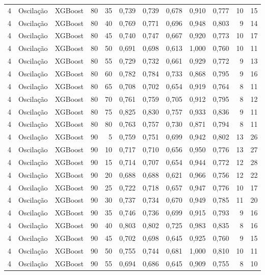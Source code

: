 \begin{longtable}{@{}rllrrrrrrrrr@{}}
4 & Oscilação & XGBoost & 80 & 35 & 0,739 & 0,739 & 0,678 & 0,910 & 0,777 & 10 & 15 \\
4 & Oscilação & XGBoost & 80 & 40 & 0,769 & 0,771 & 0,696 & 0,948 & 0,803 & 9 & 14 \\
4 & Oscilação & XGBoost & 80 & 45 & 0,740 & 0,747 & 0,667 & 0,920 & 0,773 & 10 & 17 \\
4 & Oscilação & XGBoost & 80 & 50 & 0,691 & 0,698 & 0,613 & 1,000 & 0,760 & 10 & 11 \\
4 & Oscilação & XGBoost & 80 & 55 & 0,729 & 0,732 & 0,661 & 0,929 & 0,772 & 9 & 13 \\
4 & Oscilação & XGBoost & 80 & 60 & 0,782 & 0,784 & 0,733 & 0,868 & 0,795 & 9 & 16 \\
4 & Oscilação & XGBoost & 80 & 65 & 0,708 & 0,702 & 0,654 & 0,919 & 0,764 & 8 & 11 \\
4 & Oscilação & XGBoost & 80 & 70 & 0,761 & 0,759 & 0,705 & 0,912 & 0,795 & 8 & 12 \\
4 & Oscilação & XGBoost & 80 & 75 & 0,825 & 0,830 & 0,757 & 0,933 & 0,836 & 9 & 11 \\
4 & Oscilação & XGBoost & 80 & 80 & 0,763 & 0,757 & 0,730 & 0,871 & 0,794 & 8 & 11 \\
4 & Oscilação & XGBoost & 90 & 5 & 0,759 & 0,751 & 0,699 & 0,942 & 0,802 & 13 & 26 \\
4 & Oscilação & XGBoost & 90 & 10 & 0,717 & 0,710 & 0,656 & 0,950 & 0,776 & 13 & 27 \\
4 & Oscilação & XGBoost & 90 & 15 & 0,714 & 0,707 & 0,654 & 0,944 & 0,772 & 12 & 28 \\
4 & Oscilação & XGBoost & 90 & 20 & 0,688 & 0,688 & 0,621 & 0,966 & 0,756 & 12 & 22 \\
4 & Oscilação & XGBoost & 90 & 25 & 0,722 & 0,718 & 0,657 & 0,947 & 0,776 & 10 & 17 \\
4 & Oscilação & XGBoost & 90 & 30 & 0,737 & 0,734 & 0,670 & 0,949 & 0,785 & 11 & 20 \\
4 & Oscilação & XGBoost & 90 & 35 & 0,746 & 0,736 & 0,699 & 0,915 & 0,793 & 9 & 16 \\
4 & Oscilação & XGBoost & 90 & 40 & 0,803 & 0,802 & 0,725 & 0,983 & 0,835 & 8 & 16 \\
4 & Oscilação & XGBoost & 90 & 45 & 0,702 & 0,698 & 0,645 & 0,925 & 0,760 & 9 & 15 \\
4 & Oscilação & XGBoost & 90 & 50 & 0,755 & 0,744 & 0,681 & 1,000 & 0,810 & 10 & 11 \\
4 & Oscilação & XGBoost & 90 & 55 & 0,694 & 0,686 & 0,645 & 0,909 & 0,755 & 8 & 10 \\

\end{longtable}
